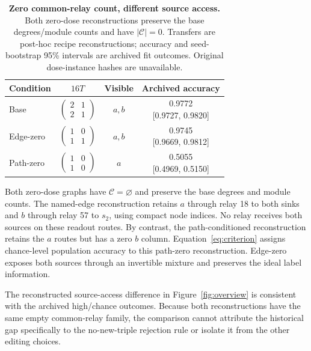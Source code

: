 \begin{table}[t]
\centering
\caption{\textbf{Zero common-relay count, different source access.}
Both zero-dose reconstructions preserve the base degrees/module counts
and have $|\mathcal C|=0$. Transfers are post-hoc recipe reconstructions;
accuracy and seed-bootstrap 95\% intervals are archived fit outcomes.
Original dose-instance hashes are unavailable.}
\label{tab:core}
\small
\begin{tabular}{@{}lccc@{}}
\toprule
Condition & $16T$ & Visible & Archived accuracy \\
\midrule
Base & $\left(\begin{smallmatrix}2&1\\2&1\end{smallmatrix}\right)$ & $a,b$ &
\shortstack{0.9772\\{[0.9727, 0.9820]}} \\[6pt]
Edge-zero & $\left(\begin{smallmatrix}1&0\\1&1\end{smallmatrix}\right)$ & $a,b$ &
\shortstack{0.9745\\{[0.9669, 0.9812]}} \\[6pt]
Path-zero & $\left(\begin{smallmatrix}1&0\\1&0\end{smallmatrix}\right)$ & $a$ &
\shortstack{0.5055\\{[0.4969, 0.5150]}} \\
\bottomrule
\end{tabular}
\end{table}

Both zero-dose graphs have $\mathcal C=\varnothing$ and preserve the
base degrees and module counts. The named-edge reconstruction retains
$a$ through relay 18 to both sinks and $b$ through relay 57 to $s_2$,
using compact node indices. No relay receives both sources on these
readout routes. By contrast, the path-conditioned reconstruction retains
the $a$ routes but has a zero $b$ column. Equation~\eqref{eq:criterion} assigns chance-level population accuracy
to this path-zero reconstruction. Edge-zero exposes both sources through
an invertible mixture and preserves the ideal label information.

The reconstructed source-access difference in Figure~\ref{fig:overview}
is consistent with the archived high/chance outcomes. Because both
reconstructions have the same empty common-relay family, the comparison
cannot attribute the historical gap specifically to the no-new-triple
rejection rule or isolate it from the other editing choices.

